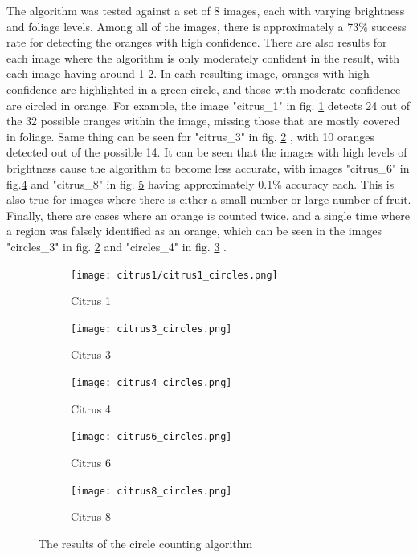 \documentclass[conference]{IEEEtran}
\begin{document}
The algorithm was tested against a set of 8 images, each with varying brightness and foliage levels. Among all of the images, there is approximately a 73\% success rate for detecting the oranges with high confidence. There are also results for each image where the algorithm is only moderately confident in the result, with each image having around 1-2. In each resulting image, oranges with high confidence are highlighted in a green circle, and those with moderate confidence are circled in orange. For example, the image "citrus\_1" in fig. \ref{fig:citrus_results_1} detects 24 out of the 32 possible oranges within the image, missing those that are mostly covered in foliage. Same thing can be seen for "citrus\_3" in fig. \ref{fig:citrus_results_3} , with 10 oranges detected out of the possible 14. It can be seen that the images with high levels of brightness cause the algorithm to become less accurate, with images "citrus\_6"  in fig.\ref{fig:citrus_results_6} and "citrus\_8" in fig. \ref{fig:citrus_results_8}  having approximately 0.1\% accuracy each. This is also true for images where there is either a small number or large number of fruit. Finally, there are cases where an orange is counted twice, and a single time where a region was falsely identified as an orange, which can be seen in the images "circles\_3" in fig. \ref{fig:citrus_results_3} and "circles\_4" in fig. \ref{fig:citrus_results_4} .

\begin{figure}[H]
  \begin{subfigure}{.3\linewidth}
 	 \texttt{[image: citrus1/citrus1\_circles.png]}\hfill
	 \caption{Citrus 1} \label{fig:citrus_results_1}
  \end{subfigure}
   \begin{subfigure}{.3\linewidth}
 	 \texttt{[image: citrus3\_circles.png]}\hfill
	 \caption{Citrus 3}  \label{fig:citrus_results_3}
  \end{subfigure}
   \begin{subfigure}{.3\linewidth}
 	 \texttt{[image: citrus4\_circles.png]}
	 \caption{Citrus 4}  \label{fig:citrus_results_4}
  \end{subfigure}\par\medskip
  
    \begin{subfigure}{.3\linewidth}
 	 \texttt{[image: citrus6\_circles.png]}\hfill
	 \caption{Citrus 6}  \label{fig:citrus_results_6}
  \end{subfigure}
   \begin{subfigure}{.3\linewidth}
 	 \texttt{[image: citrus8\_circles.png]}
	 \caption{Citrus 8}  \label{fig:citrus_results_8}
  \end{subfigure}
  \caption{The results of the circle counting algorithm} \label{fig:citrus_results}
\end{figure}
\end{document}
